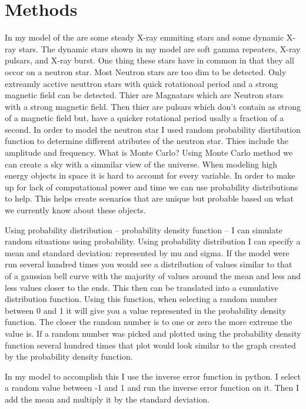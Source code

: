 \documentclass[final,8p,times,twocolumn,authoryear]{elsarticle}
\begin{document}
\section{Methods}
In my model of the are some steady X-ray emmiting stars and some dynamic X-ray stars. The dynamic stars shown in my model are soft gamma repeaters, X-ray pulsars, and X-ray burst. One thing these stars have in common in that they all occor on a neutron star. Most Neutron stars are too dim to be detected. Only extreamly acctive neuttron stars with quick rotationoal period and a strong magnetic field can be detected. Thier are Magnatars which are Neutron stars with a strong magnetic field. Then thier are pulsars which don't contain as strong of a magnetic field but, have a quicker rotational period usally a fraction of a second. 
In order to model the neutron star I used random probability disrtibution function to determine different atributes of the neutron star. Thies include the amplitude and frequency. 
What is Monte Carlo?
Using Monte Carlo method we can create a sky with a simmilar view of the universe.
When modeling high energy objects in space it is hard to account for every variable. In order to make up for lack of computational power and time we can use probability distributions to help. This helps create scenarios that are unique but probable based on what we currently know about these objects. 

Using probability distribution – probability density function – I can simulate random situations using probability. Using probability distribution I can specify a mean and standard deviation: represented by mu and sigma. If the model were run several hundred times you would see a distribution of values similar to that of a gaussian bell curve with the majority of values around the mean and less and less values closer to the ends. This then can be translated into a cumulative distribution function. Using this function, when selecting a random number between 0 and 1 it will give you a value represented in the probability density function. The closer the random number is to one or zero the more extreme the value is. If a random number was picked and plotted using the probability density function several hundred times that plot would look similar to the graph created by the probability density function.

        In my model to accomplish this I use the inverse error function in python. I select a random value between -1 and 1 and run the inverse error function on it. Then I add the mean and multiply it by the standard deviation.
        
\end{document}
